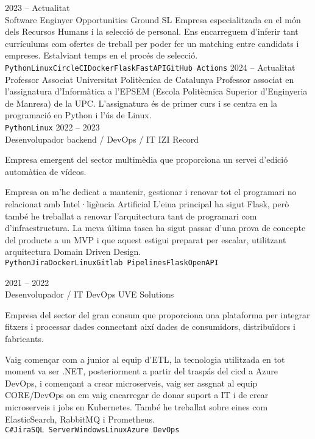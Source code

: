 \documentclass[9pt]{developercv} %
\begin{document}
\begin{entrylist}
	\entry
	{2023 -- Actualitat\\}
	{Software Enginyer}
	{Opportunities Ground SL}
	{Empresa especialitzada en el món dels Recursos Humans i la selecció de personal. Ens encarreguem d'inferir tant currículums com ofertes de treball per poder fer un matching entre candidats i empreses. Estalviant temps en el procés de selecció.
		\\ \texttt{Python}\slashsep\texttt{Linux}\slashsep\texttt{CircleCI}\slashsep\texttt{Docker}\slashsep\texttt{Flask}\slashsep\texttt{FastAPI}\slashsep\texttt{GitHub Actions}}
	\entry
	{2024 -- Actualitat\\}
	{Professor Associat}
	{Universitat Politècnica de Catalunya}
	{Professor associat en l'assignatura d'Informàtica a l'EPSEM (Escola Politècnica Superior d'Enginyeria de Manresa) de la UPC. L'assignatura és de primer curs i se centra en la programació en Python i l'ús de Linux.
		\\ \texttt{Python}\slashsep\texttt{Linux}}
	\entry
	{2022 -- 2023\\}
	{Desenvolupador backend / DevOps / IT}
	{IZI Record}
	{Empresa emergent del sector multimèdia que proporciona un servei d'edició automàtica de vídeos.

		Empresa on m'he dedicat a mantenir, gestionar i renovar tot el programari no relacionat amb Intel·ligència Artificial  L'eina principal ha sigut Flask, però també he treballat a renovar
		l'arquitectura tant de programari com d'infraestructura. La meva última tasca ha sigut passar d'una prova de concepte del producte a un MVP i que aquest estigui preparat per escalar, utilitzant arquitectura Domain Driven Design.
		\\ \texttt{Python}\slashsep\texttt{Jira}\slashsep\texttt{Docker}\slashsep\texttt{Linux}\slashsep\texttt{Gitlab Pipelines}\slashsep\texttt{Flask}\slashsep\texttt{OpenAPI}}

	\entry
	{2021 -- 2022\\}
	{Desenvolupador / IT DevOps}
	{UVE Solutions}
	{Empresa del sector del gran consum que proporciona una plataforma per integrar fitxers i
		processar dades connectant així dades de consumidors, distribuïdors i fabricants.

		Vaig començar com a junior al equip d’ETL, la tecnologia utilitzada en tot moment va ser .NET, posteriorment a partir del traspás del cicd a Azure DevOps, i començant a crear microserveis, vaig ser
		assgnat al equip CORE/DevOps on em vaig encarregar de donar suport a IT i de crear microserveis
		i jobs en Kubernetes.
		També he treballat sobre eines com ElasticSearch, RabbitMQ i Prometheus.
		\\ \texttt{C\#}\slashsep\texttt{Jira}\slashsep\texttt{SQL Server}\slashsep\texttt{Windows}\slashsep\texttt{Linux}\slashsep\texttt{Azure DevOps}}
\end{entrylist}
\clearpage
\end{document}

